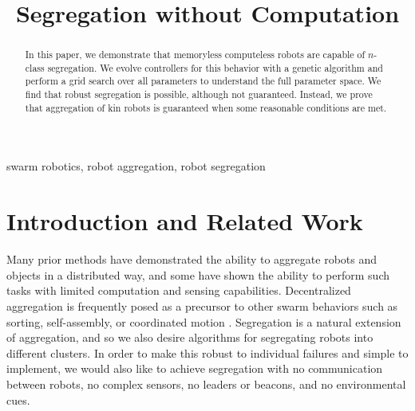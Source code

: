 \documentclass[conference]{IEEEtran}
\begin{document}
\title{Segregation without Computation}

\author{
  \and
  \and
}

\maketitle

\begin{abstract}
  In this paper, we demonstrate that memoryless computeless robots are capable of $n$-class segregation. We evolve controllers for this behavior with a genetic algorithm and perform a grid search over all parameters to understand the full parameter space. We find that robust segregation is possible, although not guaranteed. Instead, we prove that aggregation of kin robots is guaranteed when some reasonable conditions are met.
\end{abstract}

\begin{IEEEkeywords}
  swarm robotics, robot aggregation, robot segregation
\end{IEEEkeywords}

\section{Introduction and Related Work}

  Many prior methods have demonstrated the ability to aggregate robots and objects in a distributed way, and some have shown the ability to perform such tasks with limited computation and sensing capabilities. Decentralized aggregation is frequently posed as a precursor to other swarm behaviors such as sorting, self-assembly, or coordinated motion \cite{gauci_evolving_2014} \cite{dorigo_evolving_2004}. Segregation is a natural extension of aggregation, and so we also desire algorithms for segregating robots into different clusters. In order to make this robust to individual failures and simple to implement, we would also like to achieve segregation with no communication between robots, no complex sensors, no leaders or beacons, and no environmental cues.
\end{document}
